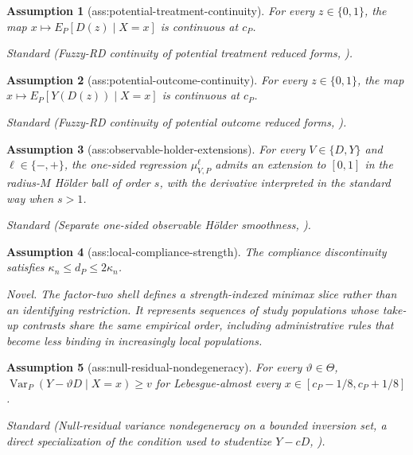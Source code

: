 \documentclass{article}
\newtheorem{assumption}{Assumption}
\begin{document}
\begin{assumption}[ass:potential-treatment-continuity]\label{ass:potential-treatment-continuity}
For every \(z\in\{0,1\}\), the map \(x\mapsto E_P[D(z)\mid X=x]\) is continuous at \(c_P\).
\par\smallskip\noindent\emph{Standard} (Fuzzy-RD continuity of potential treatment reduced forms, \cite{HahnToddVanDerKlaauw2001}).
\end{assumption}

\begin{assumption}[ass:potential-outcome-continuity]\label{ass:potential-outcome-continuity}
For every \(z\in\{0,1\}\), the map \(x\mapsto E_P[Y(D(z))\mid X=x]\) is continuous at \(c_P\).
\par\smallskip\noindent\emph{Standard} (Fuzzy-RD continuity of potential outcome reduced forms, \cite{HahnToddVanDerKlaauw2001}).
\end{assumption}

\begin{assumption}[ass:observable-holder-extensions]\label{ass:observable-holder-extensions}
For every \(V\in\{D,Y\}\) and \(\ell\in\{-,+\}\), the one-sided regression \(\mu_{V,P}^{\ell}\) admits an extension to \([0,1]\) in the radius-\(M\) H\"older ball of order \(s\), with the derivative interpreted in the standard way when \(s>1\).
\par\smallskip\noindent\emph{Standard} (Separate one-sided observable H{\"o}lder smoothness, \cite{NoackRothe2024}).
\end{assumption}

\begin{assumption}[ass:local-compliance-strength]\label{ass:local-compliance-strength}
The compliance discontinuity satisfies \(\kappa_n\le d_P\le2\kappa_n\).
\par\smallskip\noindent\emph{Novel.} The factor-two shell defines a strength-indexed minimax slice rather than an identifying restriction. It represents sequences of study populations whose take-up contrasts share the same empirical order, including administrative rules that become less binding in increasingly local populations.
\end{assumption}

\begin{assumption}[ass:null-residual-nondegeneracy]\label{ass:null-residual-nondegeneracy}
For every \(\vartheta\in\Theta\), \(\operatorname{Var}_P(Y-\vartheta D\mid X=x)\ge v\) for Lebesgue-almost every \(x\in[c_P-1/8,c_P+1/8]\).
\par\smallskip\noindent\emph{Standard} (Null-residual variance nondegeneracy on a bounded inversion set, a direct specialization of the condition used to studentize \(Y-cD\), \cite{NoackRothe2024}).
\end{assumption}
\end{document}
